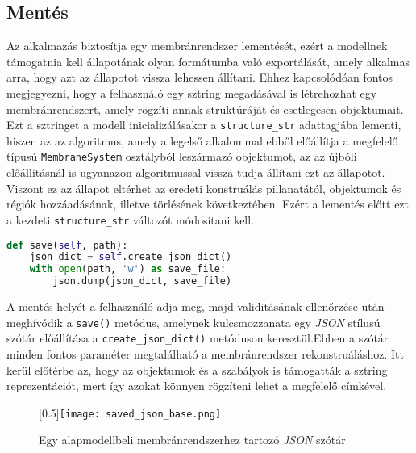 \subsection{Mentés}
Az alkalmazás biztosítja egy membránrendszer lementését, ezért a modellnek támogatnia kell állapotának olyan formátumba való exportálását, amely alkalmas arra, hogy azt az állapotot vissza lehessen állítani. Ehhez kapcsolódóan fontos megjegyezni, hogy a felhasználó egy sztring megadásával is létrehozhat egy membránrendszert, amely rögzíti annak struktúráját és esetlegesen objektumait. Ezt a sztringet a modell inicializálásakor a \verb|structure_str| adattagjába lementi, hiszen az az algoritmus, amely a legelső alkalommal ebből előállítja a megfelelő típusú \verb|MembraneSystem| osztályból leszármazó objektumot, az az újbóli előállításnál is ugyanazon algoritmussal vissza tudja állítani ezt az állapotot. Viszont ez az állapot eltérhet az eredeti konstruálás pillanatától, objektumok és régiók hozzáadásának, illetve törlésének következtében. Ezért a lementés előtt ezt a kezdeti \verb|structure_str| változót módosítani kell. 	

\begin{lstlisting}[language={Python}]
def save(self, path):
	json_dict = self.create_json_dict()
	with open(path, 'w') as save_file:
		json.dump(json_dict, save_file)
\end{lstlisting}

A mentés helyét a felhasználó adja meg, majd  validitásának ellenőrzése után meghívódik a \verb|save()| metódus, amelynek kulcsmozzanata egy \textit{JSON} stílusú szótár előállítása a \verb|create_json_dict()| metóduson keresztül.Ebben a szótár minden fontos paraméter megtalálható a membránrendszer rekonstruáláshoz. Itt kerül előtérbe az, hogy az objektumok és a szabályok is támogatták a sztring reprezentációt, mert így azokat könnyen rögzíteni lehet a megfelelő címkével. 

\begin{figure}[H]
\centering
	\scalebox{0.5}[0.5]{\texttt{[image: saved\_json\_base.png]}}
	\caption{Egy alapmodellbeli membránrendszerhez tartozó \textit{JSON} szótár}
	\label{fig:save_model_base}
\end{figure}

